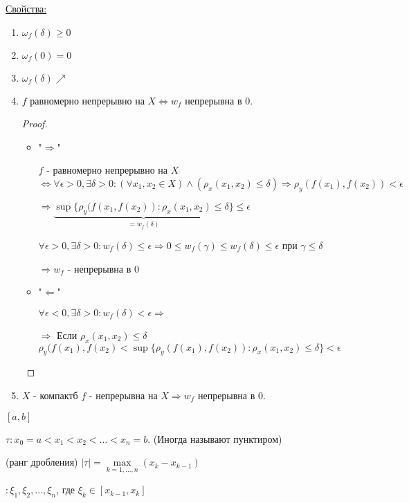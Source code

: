 \underline{Свойства:}
\begin{enumerate}
	\item $\omega_f(\delta) \ge 0$
	\item $\omega_f(0) = 0$
	\item $\omega_f(\delta)\nearrow$
	\item $f$ равномерно непрерывно на $X \Leftrightarrow w_f$ непрерывна в 0.

	\begin{proof}
		\begin{itemize}
			\item "$\Rightarrow$"

			$f$ - равномерно непрерывно на $X$ $\Leftrightarrow \forall \epsilon > 0, \exists \delta > 0 \colon (\forall x_1, x_2 \in X) \wedge 
			(\rho_x(x_1, x_2) \le \delta) \Rightarrow \rho_y(f(x_1), f(x_2)) < \epsilon$

			$\Rightarrow \underbrace{\sup\{\rho_y(f(x_1, f(x_2))\colon \rho_x(x_1, x_2) \le \delta\}}_{= w_f(\delta)} \le \epsilon$
   	
			$\forall \epsilon > 0, \exists \delta > 0 \colon w_f(\delta) \le \epsilon \Rightarrow 0 \le w_f(\gamma) \le w_f(\delta) \le \epsilon$
			при $\gamma \le \delta$   

			$\Rightarrow w_f$ - непрерывна в 0

			\item "$\Leftarrow$"

			$\forall \epsilon < 0, \exists \delta > 0 \colon w_f(\delta) < \epsilon \Rightarrow$

			$\Rightarrow$ Если $\rho_x(x_1, x_2) \le \delta$ $\rho_y(f(x_1), f(x_2) < \sup\{\rho_y(f(x_1), f(x_2))\colon \rho_x(x_1, x_2) \le \delta\} < \epsilon$
		\end{itemize}
	\end{proof}
	\item $X$ - компактб $f$ - непрерывна на $X \Rightarrow w_f$ непрерывна в 0.
\end{enumerate}

\begin{Def} $[a, b]$
	
	 $\tau \colon x_0 = a < x_1 < x_2 < \dots < x_n = b$. (Иногда называют пунктиром)

	 (ранг дробления) $ |\tau| = \max\limits_{k = 1, \dots, n}(x_k - x_{k - 1})$

	 $\colon \xi_1, \xi_2, \dots, \xi_n$, где $\xi_k \in [x_{k - 1}, x_k]$

\end{Def}

